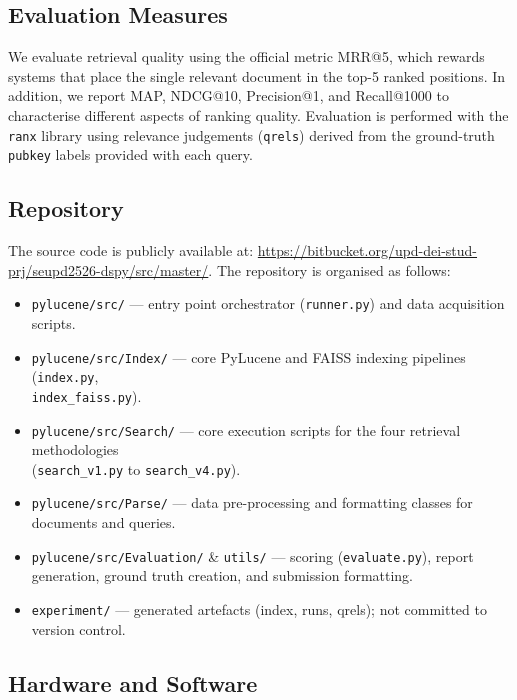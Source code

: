\subsection{Evaluation Measures}
\label{subsec:measures}

We evaluate retrieval quality using the official metric \ac{MRR}@5, which rewards
systems that place the single relevant document in the top-5 ranked positions.
In addition, we report \ac{MAP}, \ac{NDCG}@10, Precision@1, and Recall@1000 to
characterise different aspects of ranking quality.
Evaluation is performed with the \texttt{ranx} library using relevance
judgements (\texttt{qrels}) derived from the ground-truth \texttt{pubkey} labels
provided with each query.

\subsection{Repository}
\label{subsec:repo}

The source code is publicly available at:
\url{https://bitbucket.org/upd-dei-stud-prj/seupd2526-dspy/src/master/}.
%
The repository is organised as follows:
\begin{itemize}
  \item \texttt{pylucene/src/} — entry point orchestrator (\texttt{runner.py}) and data acquisition scripts.
  \item \texttt{pylucene/src/Index/} — core PyLucene and FAISS indexing pipelines (\texttt{index.py}, \\ \texttt{index\_faiss.py}).
  \item \texttt{pylucene/src/Search/} — core execution scripts for the four retrieval methodologies \\(\texttt{search\_v1.py} to \texttt{search\_v4.py}).
  \item \texttt{pylucene/src/Parse/} — data pre-processing and formatting classes for documents and queries.
  \item \texttt{pylucene/src/Evaluation/} \& \texttt{utils/} — scoring (\texttt{evaluate.py}), report generation, ground truth creation, and submission formatting.
  \item \texttt{experiment/} — generated artefacts (index, runs, qrels); not committed to version control.
\end{itemize}

\subsection{Hardware and Software}
\label{subsec:hardware}

